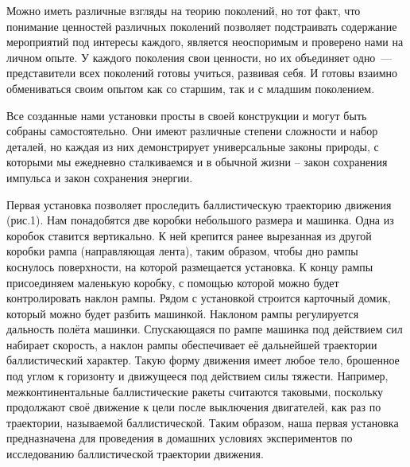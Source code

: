 Можно иметь различные взгляды на теорию поколений, но тот факт, что понимание ценностей различных поколений позволяет подстраивать содержание мероприятий под интересы каждого, является неоспоримым и проверено нами на личном опыте. У каждого поколения свои ценности, но их объединяет одно~--- представители всех поколений готовы учиться, развивая себя. И готовы взаимно обмениваться своим опытом как со старшим, так и с младшим поколением.

Все созданные нами установки просты в своей конструкции и могут быть собраны самостоятельно. Они имеют различные степени сложности и набор деталей, но каждая из них демонстрирует универсальные законы природы, с которыми мы ежедневно сталкиваемся и в обычной жизни – закон сохранения импульса и закон сохранения энергии.

Первая установка позволяет проследить баллистическую траекторию движения (рис.1). Нам понадобятся две коробки небольшого размера и машинка. Одна из коробок ставится вертикально. К ней крепится ранее вырезанная из другой коробки рампа (направляющая лента), таким образом, чтобы дно рампы коснулось поверхности, на которой размещается установка.  К концу рампы присоединяем маленькую коробку, с помощью которой можно будет контролировать наклон рампы. Рядом с установкой строится карточный домик, который можно будет разбить машинкой. Наклоном рампы регулируется дальность полёта машинки. Спускающаяся по рампе машинка под действием сил набирает скорость, а наклон рампы обеспечивает её дальнейшей траектории баллистический характер. Такую форму движения имеет любое тело, брошенное под углом к горизонту и движущееся под действием силы тяжести. Например, межконтинентальные баллистические ракеты считаются таковыми, поскольку продолжают своё движение к цели после выключения двигателей, как раз по траектории, называемой баллистической. Таким образом, наша первая установка предназначена для проведения в домашних условиях экспериментов по исследованию баллистической траектории движения.



